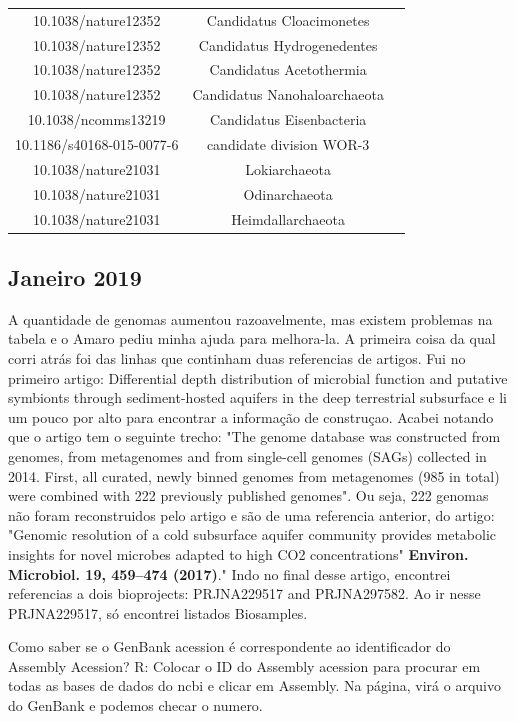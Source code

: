 \documentclass[12pt, a4paper]{report}
\begin{document}
\begin{center}
\begin{longtable}{ccc}
10.1038/nature12352	&	Candidatus Cloacimonetes	\\
10.1038/nature12352	&	Candidatus Hydrogenedentes	\\
10.1038/nature12352	&	Candidatus Acetothermia	\\
10.1038/nature12352	&	Candidatus Nanohaloarchaeota	\\
10.1038/ncomms13219	&	Candidatus Eisenbacteria	\\
10.1186/s40168-015-0077-6	&	candidate division WOR-3	\\
10.1038/nature21031 &  Lokiarchaeota \\
10.1038/nature21031 & Odinarchaeota \\
10.1038/nature21031 & Heimdallarchaeota \\
 \hline
  \end{longtable}
\end{center}

\subsection{Janeiro 2019}
A quantidade de genomas aumentou razoavelmente, mas existem problemas na tabela e o Amaro pediu minha ajuda para melhora-la. A primeira coisa da qual corri atrás foi das linhas que continham duas referencias de artigos. Fui no primeiro artigo: Differential depth distribution of microbial function and putative symbionts through sediment-hosted aquifers in the deep terrestrial subsurface e li um pouco por alto para encontrar a informação de construçao. Acabei notando que o artigo tem o seguinte trecho: "The genome database was constructed from genomes, from metagenomes and from single-cell genomes (SAGs) collected in 2014. First, all curated, newly binned genomes from metagenomes (985 in total) were combined with 222 previously published genomes". Ou seja, 222 genomas não foram reconstruidos pelo artigo e são de uma referencia anterior, do artigo: "Genomic resolution of a cold subsurface aquifer community provides metabolic insights for novel microbes adapted to high CO2 concentrations" \textbf{Environ. Microbiol. 19, 459–474 (2017)}." Indo no final desse artigo, encontrei referencias a dois bioprojects: PRJNA229517 and PRJNA297582. Ao ir nesse PRJNA229517, só encontrei listados Biosamples. 

Como saber se o GenBank acession é correspondente ao identificador do Assembly Acession? R: Colocar o ID do Assembly acession para procurar em todas as bases de dados do ncbi e clicar em Assembly. Na página, virá o arquivo do GenBank e podemos checar o numero. 
\end{document}
